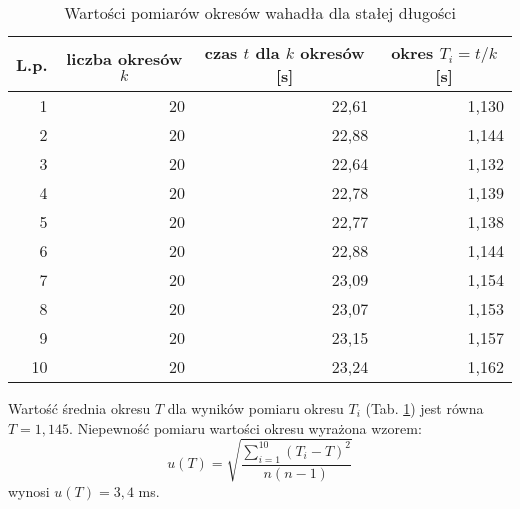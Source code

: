 \documentclass[12pt,a4paper]{article}
\begin{document}
\begin{table}[!ht]
	\caption{Wartości pomiarów okresów wahadła dla stałej długości}
	\begin{center}
		\begin{tabular}{r|r|r|r}
			\hline
			\multicolumn{1}{c|}{L.p.} & \multicolumn{1}{c|}{liczba okresów $k$} & \multicolumn{1}{c|}{czas $t$ dla $k$ okresów [s]} & \multicolumn{1}{c}{okres $T_i = t/k$ [s]} \\ \hline \hline
			1 & 20 & 22,61 & 1,130 \\
			2 & 20 & 22,88 & 1,144 \\
			3 & 20 & 22,64 & 1,132 \\
			4 & 20 & 22,78 & 1,139 \\
			5 & 20 & 22,77 & 1,138 \\
			6 & 20 & 22,88 & 1,144 \\
			7 & 20 & 23,09 & 1,154 \\
			8 & 20 & 23,07 & 1,153 \\
			9 & 20 & 23,15 & 1,157 \\
			10 & 20 & 23,24 & 1,162 \\ \hline
		\end{tabular}
	\end{center}
	\label{tab:tab1}
\end{table}
Wartość średnia okresu $T$ dla wyników pomiaru okresu $T_i$ (Tab. \ref{tab:tab1}) jest równa $T = 1,145$. Niepewność pomiaru wartości okresu wyrażona wzorem:
\begin{equation}
	u(T) = \sqrt{\frac{\sum_{i=1}^{10}(T_i - T)^2}{n(n-1)}}
\end{equation}
wynosi $u(T) = 3,4$ ms.
\end{document}
